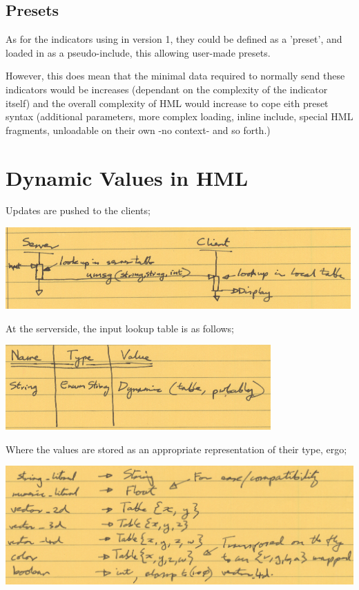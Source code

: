 \documentclass[10pt,a4paper]{article}
\begin{document}
\subsection{Presets}

As for the indicators using in version 1, they could be defined as a 'preset', and loaded in as a pseudo-include, this allowing user-made presets.

However, this does mean that the minimal data required to normally send these indicators would be increases (dependant on the complexity of the indicator itself) and the overall complexity of HML would increase to cope eith preset syntax (additional parameters, more complex loading, inline include, special HML fragments, unloadable on their own -no context- and so forth.)


\section{Dynamic Values in HML}

Updates are pushed to the clients;

\includegraphics[scale=0.75]{images/push_updates.png}

At the serverside, the input lookup table is as follows;

\includegraphics[scale=0.75]{images/serverside_lookup_table.png}

Where the values are stored as an appropriate representation of their type, ergo;

\includegraphics[scale=0.75]{images/serverside_lookup_types.png}
\end{document}
